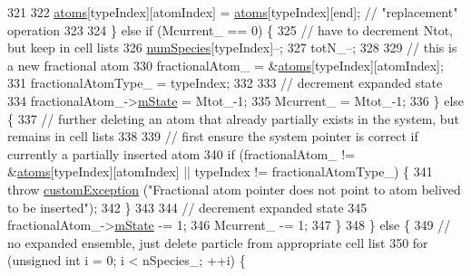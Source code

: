 \begin{DoxyCode}
321 
322                         \hyperlink{classsim_system_a90421b19082f7fb8fc23b7264b1161e4}{atoms}[typeIndex][atomIndex] = \hyperlink{classsim_system_a90421b19082f7fb8fc23b7264b1161e4}{atoms}[typeIndex][end];    \textcolor{comment}{// "replacement"
       operation}
323 
324                     \} \textcolor{keywordflow}{else} \textcolor{keywordflow}{if} (Mcurrent\_ == 0) \{
325                         \textcolor{comment}{// have to decrement Ntot, but keep in cell lists}
326                         \hyperlink{classsim_system_a9eea865e6dc1cff377b1e79c4d9c23f0}{numSpecies}[typeIndex]--;
327                         totN\_--;
328 
329                         \textcolor{comment}{// this is a new fractional atom}
330                         fractionalAtom\_ = &\hyperlink{classsim_system_a90421b19082f7fb8fc23b7264b1161e4}{atoms}[typeIndex][atomIndex];
331                         fractionalAtomType\_ = typeIndex;
332 
333                         \textcolor{comment}{// decrement expanded state}
334                         fractionalAtom\_->\hyperlink{classatom_a3cb00c0c5b7533657e05af6ff4a42740}{mState} = Mtot\_-1;
335                         Mcurrent\_ = Mtot\_-1;
336                     \} \textcolor{keywordflow}{else} \{
337                         \textcolor{comment}{// further deleting an atom that already partially exists in the system, but
       remains in cell lists}
338 
339                         \textcolor{comment}{// first ensure the system pointer is correct if currently a partially inserted
       atom}
340                         \textcolor{keywordflow}{if} (fractionalAtom\_ != &\hyperlink{classsim_system_a90421b19082f7fb8fc23b7264b1161e4}{atoms}[typeIndex][atomIndex] || typeIndex != 
      fractionalAtomType\_) \{
341                             \textcolor{keywordflow}{throw} \hyperlink{classcustom_exception}{customException} (\textcolor{stringliteral}{"Fractional atom pointer does not point
       to atom belived to be inserted"});
342                         \}
343 
344                         \textcolor{comment}{// decrement expanded state}
345                         fractionalAtom\_->\hyperlink{classatom_a3cb00c0c5b7533657e05af6ff4a42740}{mState} -= 1;
346                         Mcurrent\_ -= 1;
347                     \}
348                 \} \textcolor{keywordflow}{else} \{
349                     \textcolor{comment}{// no expanded ensemble, just delete particle from appropriate cell list}
350                     \textcolor{keywordflow}{for} (\textcolor{keywordtype}{unsigned} \textcolor{keywordtype}{int} i = 0; i < nSpecies\_; ++i) \{

\end{DoxyCode}
